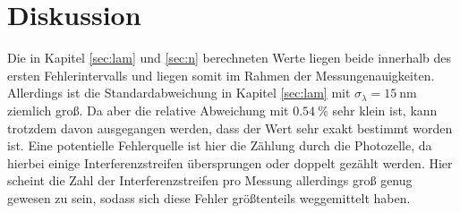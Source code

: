 \section{Diskussion}

Die in Kapitel \ref{sec:lam} und \ref{sec:n} berechneten Werte liegen beide innerhalb des ersten Fehlerintervalls und liegen somit im Rahmen
der Messungenauigkeiten. Allerdings ist die Standardabweichung in Kapitel \ref{sec:lam} mit $\sigma_{\lambda} = \SI{15}{\nm}$ ziemlich groß.
Da aber die relative Abweichung mit $\SI{0,54}{\%}$ sehr klein ist, kann trotzdem davon ausgegangen werden, dass der Wert sehr exakt bestimmt worden ist.
Eine potentielle Fehlerquelle ist hier die Zählung durch die Photozelle, da hierbei einige Interferenzstreifen übersprungen oder doppelt
gezählt werden. Hier scheint die Zahl der Interferenzstreifen pro Messung allerdings groß genug gewesen zu sein, sodass sich diese Fehler
größtenteils weggemittelt haben.
